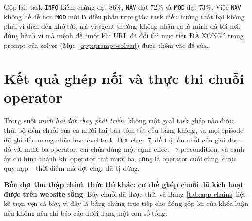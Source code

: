 \noindent
Gộp lại, task \texttt{INFO} kiểm chứng đạt 86\%, \texttt{NAV} đạt 72\% và
\texttt{MOD} đạt 73\%. Việc \texttt{NAV} không hề dễ hơn \texttt{MOD} mới là
điều phản trực giác: task điều hướng thất bại không phải vì đích đến khó tới,
mà vì agent thường không nhận ra là mình đã tới nơi, đúng hành vi mà mệnh đề
``một khi URL đã đổi thì mục tiêu ĐÃ XONG'' trong prompt của solver
(Mục~\ref{app:prompt-solver}) được thêm vào để sửa.

\section{Kết quả ghép nối và thực thi chuỗi operator}
\label{app:runs-goal}

Trong suốt \emph{mười hai đợt chạy phát triển}, không một goal task ghép nào được
thử: bộ đếm chuỗi của cả mười hai bản tóm tắt đều bằng không, và mọi episode
đã ghi đều mang nhãn low-level task. Đợt chạy~7, đồ thị lớn nhất của giai đoạn đó
với mười ba operator, chỉ chứa đúng một cạnh
effect$\rightarrow$precondition, và cạnh ấy chỉ hình thành khi operator thứ
mười ba, cũng là operator cuối cùng, được quy nạp -- thời điểm mà đợt chạy đã bị
dừng.

\textbf{Bốn đợt thu thập chính thức thì khác: cơ chế ghép chuỗi đã kích hoạt
được trên website sống.} Bảy chuỗi đã được thử, và
Bảng~\ref{tab:app-chains} liệt kê trọn vẹn cả bảy, vì đây là bằng chứng
trực tiếp cho đóng góp lõi của khóa luận nên không nên chỉ báo cáo dưới dạng
một con số tổng.

